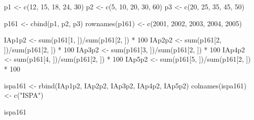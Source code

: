 \documentclass[
]{book}
\newenvironment{Shaded}{\begin{snugshade}}{\end{snugshade}}
\newcommand{\DecValTok}[1]{\textcolor[rgb]{0.00,0.00,0.81}{#1}}
\newcommand{\FunctionTok}[1]{\textcolor[rgb]{0.00,0.00,0.00}{#1}}
\newcommand{\NormalTok}[1]{#1}
\newcommand{\OtherTok}[1]{\textcolor[rgb]{0.56,0.35,0.01}{#1}}
\newcommand{\SpecialCharTok}[1]{\textcolor[rgb]{0.00,0.00,0.00}{#1}}
\newcommand{\StringTok}[1]{\textcolor[rgb]{0.31,0.60,0.02}{#1}}
\begin{document}
\begin{Shaded}
\begin{Highlighting}[]
\NormalTok{p1 }\OtherTok{\textless{}{-}} \FunctionTok{c}\NormalTok{(}\DecValTok{12}\NormalTok{, }\DecValTok{15}\NormalTok{, }\DecValTok{18}\NormalTok{, }\DecValTok{24}\NormalTok{, }\DecValTok{30}\NormalTok{)}
\NormalTok{p2 }\OtherTok{\textless{}{-}} \FunctionTok{c}\NormalTok{(}\DecValTok{5}\NormalTok{, }\DecValTok{10}\NormalTok{, }\DecValTok{20}\NormalTok{, }\DecValTok{30}\NormalTok{, }\DecValTok{60}\NormalTok{)}
\NormalTok{p3 }\OtherTok{\textless{}{-}} \FunctionTok{c}\NormalTok{(}\DecValTok{20}\NormalTok{, }\DecValTok{25}\NormalTok{, }\DecValTok{35}\NormalTok{, }\DecValTok{45}\NormalTok{, }\DecValTok{50}\NormalTok{)}

\NormalTok{p161 }\OtherTok{\textless{}{-}} \FunctionTok{cbind}\NormalTok{(p1, p2, p3)}
\FunctionTok{rownames}\NormalTok{(p161) }\OtherTok{\textless{}{-}} \FunctionTok{c}\NormalTok{(}\DecValTok{2001}\NormalTok{, }\DecValTok{2002}\NormalTok{, }\DecValTok{2003}\NormalTok{, }\DecValTok{2004}\NormalTok{, }\DecValTok{2005}\NormalTok{)}

\NormalTok{IAp1p2 }\OtherTok{\textless{}{-}} \FunctionTok{sum}\NormalTok{(p161[}\DecValTok{1}\NormalTok{, ])}\SpecialCharTok{/}\FunctionTok{sum}\NormalTok{(p161[}\DecValTok{2}\NormalTok{, ]) }\SpecialCharTok{*} \DecValTok{100}
\NormalTok{IAp2p2 }\OtherTok{\textless{}{-}} \FunctionTok{sum}\NormalTok{(p161[}\DecValTok{2}\NormalTok{, ])}\SpecialCharTok{/}\FunctionTok{sum}\NormalTok{(p161[}\DecValTok{2}\NormalTok{, ]) }\SpecialCharTok{*} \DecValTok{100}
\NormalTok{IAp3p2 }\OtherTok{\textless{}{-}} \FunctionTok{sum}\NormalTok{(p161[}\DecValTok{3}\NormalTok{, ])}\SpecialCharTok{/}\FunctionTok{sum}\NormalTok{(p161[}\DecValTok{2}\NormalTok{, ]) }\SpecialCharTok{*} \DecValTok{100}
\NormalTok{IAp4p2 }\OtherTok{\textless{}{-}} \FunctionTok{sum}\NormalTok{(p161[}\DecValTok{4}\NormalTok{, ])}\SpecialCharTok{/}\FunctionTok{sum}\NormalTok{(p161[}\DecValTok{2}\NormalTok{, ]) }\SpecialCharTok{*} \DecValTok{100}
\NormalTok{IAp5p2 }\OtherTok{\textless{}{-}} \FunctionTok{sum}\NormalTok{(p161[}\DecValTok{5}\NormalTok{, ])}\SpecialCharTok{/}\FunctionTok{sum}\NormalTok{(p161[}\DecValTok{2}\NormalTok{, ]) }\SpecialCharTok{*} \DecValTok{100}

\NormalTok{ispa161 }\OtherTok{\textless{}{-}} \FunctionTok{rbind}\NormalTok{(IAp1p2, IAp2p2, IAp3p2, IAp4p2, IAp5p2)}
\FunctionTok{colnames}\NormalTok{(ispa161) }\OtherTok{\textless{}{-}} \FunctionTok{c}\NormalTok{(}\StringTok{"ISPA"}\NormalTok{)}

\NormalTok{ispa161}
\end{Highlighting}
\end{Shaded}
\end{document}
